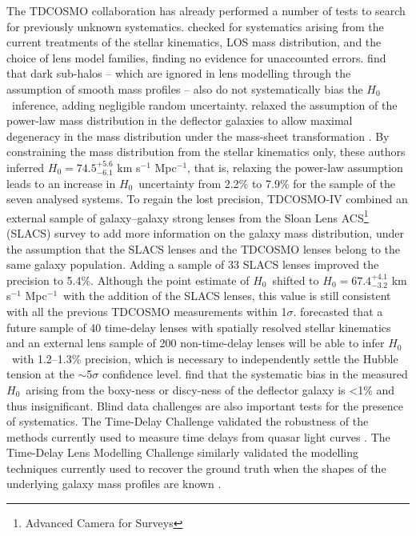 \documentclass[longauth]{aa}
\newcommand{\ho}{$H_0$}
\newcommand{\hunit}{km s$^{-1}$ Mpc$^{-1}$}
\newcommand{\ajs}[1]{{{#1}}}
\newcommand{\ajsiv}[1]{{{#1}}}
\newcommand{\lreply}[1]{{{#1}}}
\begin{document}
The TDCOSMO collaboration has already performed a number of tests to search for previously unknown systematics. \citet[][TDCOSMO-I]{Millon20} checked for systematics arising from the current treatments of the stellar kinematics, LOS mass distribution, and the choice of lens model families, finding no evidence for unaccounted errors. \citet[][TDCOSMO-III]{Gilman20} find that dark sub-halos -- which are ignored in lens modelling through the assumption of smooth mass profiles -- also do not systematically bias the \ho\ inference, adding negligible random uncertainty. \citet[][TDCOSMO-IV]{Birrer20} relaxed the assumption of the power-law mass distribution in the deflector galaxies \ajs{to allow maximal degeneracy in the mass distribution} under the mass-sheet transformation \citep[MST;][]{Falco85}. By constraining the mass distribution from the stellar kinematics only, these authors inferred $H_0 = 74.5_{-6.1}^{+5.6}$ \hunit, that is, relaxing the power-law assumption leads to an increase in \ho\ uncertainty from 2.2\% to 7.9\% for the sample of the seven analysed systems. To regain the lost precision, TDCOSMO-IV combined an external sample of galaxy--galaxy strong lenses from the Sloan Lens ACS\footnote{\lreply{Advanced Camera for Surveys}} (SLACS) survey to add more information on the galaxy mass distribution, {under the assumption that the SLACS lenses and the TDCOSMO lenses belong to the same galaxy population}. Adding a sample of 33 SLACS lenses improved the precision to 5.4\%. Although the point estimate of \ho\ shifted to $H_0 = 67.4_{-3.2}^{+4.1}$ \hunit\ with the addition of the SLACS lenses, this value is still consistent with all the previous TDCOSMO measurements within 1$\sigma$. \citet[][TDCOSMO-V]{Birrer21c} forecasted that a future sample of 40 time-delay lenses with spatially resolved stellar kinematics and an external lens sample of 200 non-time-delay lenses will be able to infer \ho\ with 1.2--1.3\% precision, which is necessary to independently settle the Hubble tension at the $\sim$5$\sigma$ confidence level. \ajsiv{\citet[][TDCOSMO-VII]{VandeVyvere22} find that the systematic bias in the measured \ho\ arising from the boxy-ness or discy-ness of the deflector galaxy is <1\% and thus insignificant.}  Blind data challenges are also important tests for the presence of systematics. The Time-Delay Challenge validated the robustness of the methods currently used  to measure time delays from quasar light curves \citep{Dobler15, Liao15}. The Time-Delay Lens Modelling Challenge similarly validated the modelling techniques currently used to recover the ground truth when the shapes of the underlying galaxy mass profiles are known \citep{Ding21b}.
\end{document}
